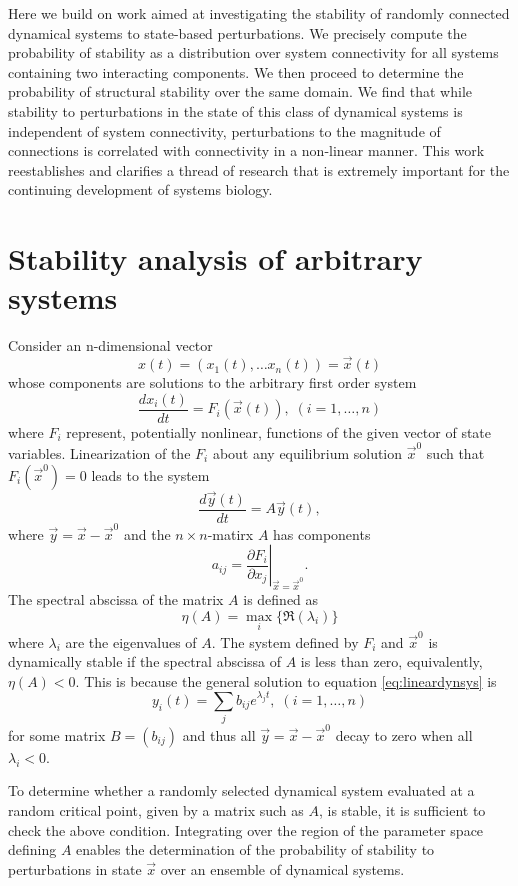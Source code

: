 \documentclass{amsart}
\theoremstyle{definition}
\theoremstyle{remark}
\numberwithin{equation}{section}
\begin{document}
Here we build on work aimed at investigating the stability of randomly connected dynamical systems to state-based perturbations. We precisely compute the probability of stability as a distribution over system connectivity for all systems containing two interacting components. We then proceed to determine the probability of structural stability over the same domain. We find that while stability to perturbations in the state of this class of dynamical systems is independent of system connectivity, perturbations to the magnitude of connections is correlated with connectivity in a non-linear manner. This work reestablishes and clarifies a thread of research that is extremely important for the continuing development of systems biology.

\section{Stability analysis of arbitrary systems}

Consider an n-dimensional vector
$$
x(t) = (x_1(t), \ldots x_n(t)) = \vec{x}(t)
$$
whose components are solutions to the arbitrary first order system
$$
\frac{dx_i(t)}{dt} = F_i(\vec{x}(t)), \; (i=1,\ldots,n)
$$
where $F_i$ represent, potentially nonlinear, functions of the given vector of state variables. Linearization of the $F_i$ about any equilibrium solution $\vec{x}^0$ such that $F_i(\vec{x}^0)=0$ leads to the system
\begin{equation}\label{eq:lineardynsys}
\frac{d\vec{y}(t)}{dt} = A \vec{y}(t),
\end{equation}
where $\vec{y} = \vec{x} - \vec{x}^0$ and the $n \times n$-matirx $A$ has components
$$
a_{ij} = \left. \frac{\partial F_i}{\partial x_j} \right|_{\vec{x} = \vec{x}^0}.
$$
The spectral abscissa of the matrix $A$ is defined as
$$
\eta(A) = \max_i \{\Re(\lambda_i)\}
$$
where $\lambda_i$ are the eigenvalues of $A$. The system defined by $F_i$ and $\vec{x}^0$ is dynamically stable if the spectral abscissa of $A$ is less than zero, equivalently, $\eta(A) < 0$. This is because the general solution to equation \ref{eq:lineardynsys} is
$$
y_i(t) = \sum_j b_{ij} e^{\lambda_j t}, \; (i=1,\ldots,n)
$$
for some matrix $B=(b_{ij})$ and thus all $\vec{y} = \vec{x} - \vec{x}^0$ decay to zero when all $\lambda_i < 0$.

To determine whether a randomly selected dynamical system evaluated at a random critical point, given by a matrix such as $A$, is stable, it is sufficient to check the above condition. Integrating over the region of the parameter space defining $A$ enables the determination of the probability of stability to perturbations in state $\vec{x}$ over an ensemble of dynamical systems.
\end{document}
